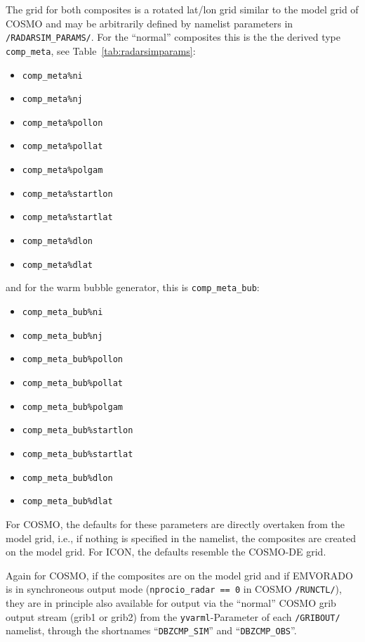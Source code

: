 \documentclass[10pt,a4paper,twoside,headinclude,footinclude,parskip=half]{scrartcl}
\newcommand{\srcform}[1]{\mbox{\texttt{#1}}\xspace}%
\begin{document}
The grid for both composites is a rotated lat/lon grid similar to the model grid of COSMO and
may be arbitrarily defined by namelist parameters in \srcform{/RADARSIM_PARAMS/}. For the ``normal'' composites this is the
the derived type \srcform{comp_meta}, see Table~\ref{tab:radarsimparams}:
\begin{itemize}
\item \srcform{comp_meta\%ni}
\item \srcform{comp_meta\%nj}
\item \srcform{comp_meta\%pollon}
\item \srcform{comp_meta\%pollat}
\item \srcform{comp_meta\%polgam}
\item \srcform{comp_meta\%startlon}
\item \srcform{comp_meta\%startlat}
\item \srcform{comp_meta\%dlon}
\item \srcform{comp_meta\%dlat}
\end{itemize}
and for the warm bubble generator, this is \srcform{comp_meta_bub}:
\begin{itemize}
\item \srcform{comp_meta_bub\%ni}
\item \srcform{comp_meta_bub\%nj}
\item \srcform{comp_meta_bub\%pollon}
\item \srcform{comp_meta_bub\%pollat}
\item \srcform{comp_meta_bub\%polgam}
\item \srcform{comp_meta_bub\%startlon}
\item \srcform{comp_meta_bub\%startlat}
\item \srcform{comp_meta_bub\%dlon}
\item \srcform{comp_meta_bub\%dlat}
\end{itemize}

For COSMO, the defaults for these parameters are directly overtaken from the model grid, i.e.,
if nothing is specified in the namelist, the composites are created on the model grid. For ICON,
the defaults resemble the COSMO-DE grid.

Again for COSMO, if the composites are on the model grid and if EMVORADO is in synchroneous
output mode (\srcform{nprocio_radar == 0} in COSMO \srcform{/RUNCTL/}), they are in principle also available
for output via the ``normal'' COSMO grib output stream (grib1 or grib2) from the \srcform{yvarml}-Parameter
of each \srcform{/GRIBOUT/} namelist, through the
shortnames ``\srcform{DBZCMP_SIM}'' and ``\srcform{DBZCMP_OBS}''.
\end{document}
